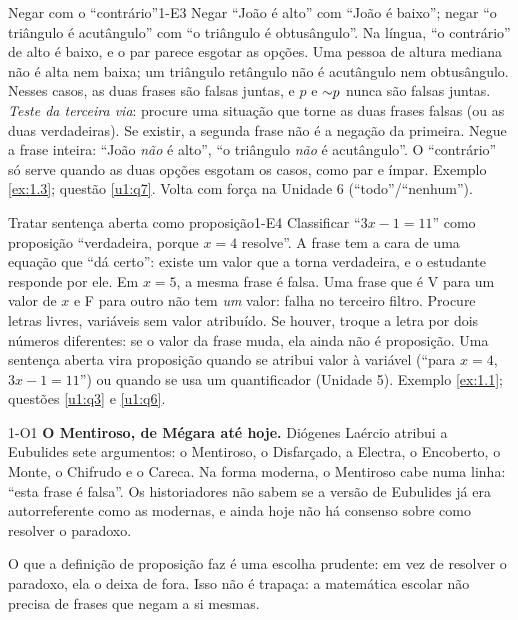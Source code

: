 \begin{erro}{Negar com o \enquote{contrário}}{1-E3}
 Negar \enquote{João é alto} com \enquote{João é baixo}; negar \enquote{o triângulo é acutângulo} com \enquote{o triângulo é obtusângulo}.
 Na língua, \enquote{o contrário} de alto é baixo, e o par parece esgotar as opções.
 Uma pessoa de altura mediana não é alta nem baixa; um triângulo retângulo não é acutângulo nem obtusângulo. Nesses casos, as duas frases são falsas juntas, e $p$ e ${\sim} p$ nunca são falsas juntas.
 \emph{Teste da terceira via}: procure uma situação que torne as duas frases falsas (ou as duas verdadeiras). Se existir, a segunda frase não é a negação da primeira.
 Negue a frase inteira: \enquote{João \emph{não} é alto}, \enquote{o triângulo \emph{não} é acutângulo}. O \enquote{contrário} só serve quando as duas opções esgotam os casos, como par e ímpar.
 Exemplo \ref{ex:1.3}; questão \ref{u1:q7}. Volta com força na Unidade 6 (\enquote{todo}/\enquote{nenhum}).
\end{erro}

\begin{erro}{Tratar sentença aberta como proposição}{1-E4}
 Classificar \enquote{$3x-1=11$} como proposição \enquote{verdadeira, porque $x=4$ resolve}.
 A frase tem a cara de uma equação que \enquote{dá certo}: existe um valor que a torna verdadeira, e o estudante responde por ele.
 Em $x=5$, a mesma frase é falsa. Uma frase que é V para um valor de $x$ e F para outro não tem \emph{um} valor: falha no terceiro filtro.
 Procure letras livres, variáveis sem valor atribuído. Se houver, troque a letra por dois números diferentes: se o valor da frase muda, ela ainda não é proposição.
 Uma sentença aberta vira proposição quando se atribui valor à variável (\enquote{para $x=4$, $3x-1=11$}) ou quando se usa um quantificador (Unidade 5).
 Exemplo \ref{ex:1.1}; questões \ref{u1:q3} e \ref{u1:q6}.
\end{erro}

\Observacoes

\begin{obs}{1-O1}
\textbf{O Mentiroso, de Mégara até hoje.} Diógenes Laércio atribui a Eubulides sete argumentos: o Mentiroso, o Disfarçado, a Electra, o Encoberto, o Monte, o Chifrudo e o Careca. Na forma moderna, o Mentiroso cabe numa linha: \enquote{esta frase é falsa}. Os historiadores não sabem se a versão de Eubulides já era autorreferente como as modernas, e ainda hoje não há consenso sobre como resolver o paradoxo.

O que a definição de proposição faz é uma escolha prudente: em vez de resolver o paradoxo, ela o deixa de fora. Isso não é trapaça: a matemática escolar não precisa de frases que negam a si mesmas.
\end{obs}

